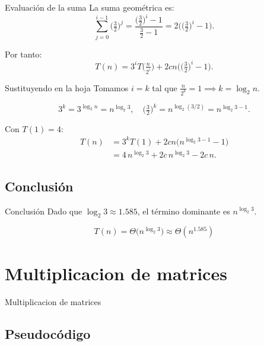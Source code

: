 \documentclass{beamer}
\begin{document}
\begin{frame}{Evaluación de la suma}
La suma geométrica es:
\[
\sum_{j=0}^{i-1}\Big(\tfrac{3}{2}\Big)^{j}
= \frac{\big(\tfrac{3}{2}\big)^{i}-1}{\tfrac{3}{2}-1}
= 2\Big(\big(\tfrac{3}{2}\big)^{i}-1\Big).
\]

Por tanto:
\[
T(n)=3^{i}T\!\big(\tfrac{n}{2^{i}}\big) + 2c n\Big(\big(\tfrac{3}{2}\big)^{i}-1\Big).
\]
\end{frame}

\begin{frame}{Sustituyendo en la hoja}
Tomamos $i=k$ tal que $\tfrac{n}{2^{k}}=1 \implies k=\log_2 n$.

\[
3^{k}=3^{\log_2 n}=n^{\log_2 3}, \quad
\Big(\tfrac{3}{2}\Big)^{k}=n^{\log_2(3/2)}=n^{\log_2 3 -1}.
\]

Con $T(1)=4$:
\[
\begin{aligned}
T(n) &= 3^{k}T(1) + 2c n\Big(n^{\log_2 3 -1}-1\Big)\\[6pt]
     &= 4\,n^{\log_2 3} + 2c\,n^{\log_2 3} - 2c\,n.
\end{aligned}
\]
\end{frame}

\subsection{Conclusión}
\begin{frame}{Conclusión}
Dado que $\log_2 3 \approx 1.585$, el término dominante es $n^{\log_2 3}$.

\[
\boxed{T(n)=\Theta\!\big(n^{\log_2 3}\big) \approx \Theta(n^{1.585})}
\]


\end{frame}



\section{Multiplicacion de matrices}
\begin{frame}{Multiplicacion de matrices}
        \tableofcontents[sections={4}]
\end{frame}
\subsection{Pseudocódigo}
\end{document}
